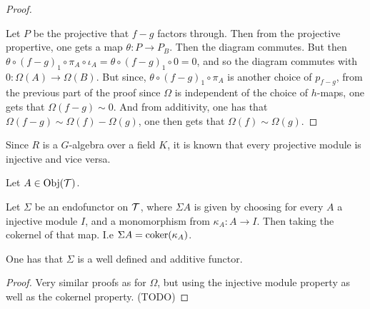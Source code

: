 \begin{proof}
\begin{center}
    \end{center}

    Let \( P \) be the projective that \( f - g \) factors through. Then from the projective propertive, one gets a map \( \theta: P \to P_B \). Then the diagram commutes. But then \( \theta \circ (f-g)_1 \circ \pi_A \circ \iota_A = \theta \circ (f-g)_1 \circ 0 = 0 \), and so the diagram commutes with \( 0: \Omega(A) \to \Omega(B) \). But since, \( \theta \circ (f-g)_1 \circ \pi_A \) is another choice of \( p_{f - g} \), from the previous part of the proof since \( \Omega \) is independent of the choice of \( h \)-maps, one gets that \( \Omega(f - g) \sim 0 \). And from additivity, one has that \( \Omega(f - g) \sim \Omega(f) - \Omega(g) \), one then gets that \( \Omega(f) \sim \Omega(g) \).
\end{proof}

\begin{remark}
    Since \( R \) is a \( G \)-algebra over a field \( K \), it is known that every projective module is injective and vice versa.
\end{remark}

\begin{definition}
    Let \( A \in \operatorname{Obj}({\mathcal{T}}) \).

    Let \( \Sigma \) be an endofunctor on \( {\mathcal{T}} \), where \( \Sigma A \) is given by choosing for every \( A \) a injective module \( I \), and a monomorphism from \( \kappa_A: A \to I \). Then taking the cokernel of that map. I.e \( \Sigma A = \operatorname{coker}(\kappa_A) \).
\end{definition}

\begin{lemma}
    One has that \( \Sigma \) is a well defined and additive functor.
\end{lemma}
\begin{proof}
    Very similar proofs as for \( \Omega \), but using the injective module property as well as the cokernel property. (TODO)
\end{proof}

